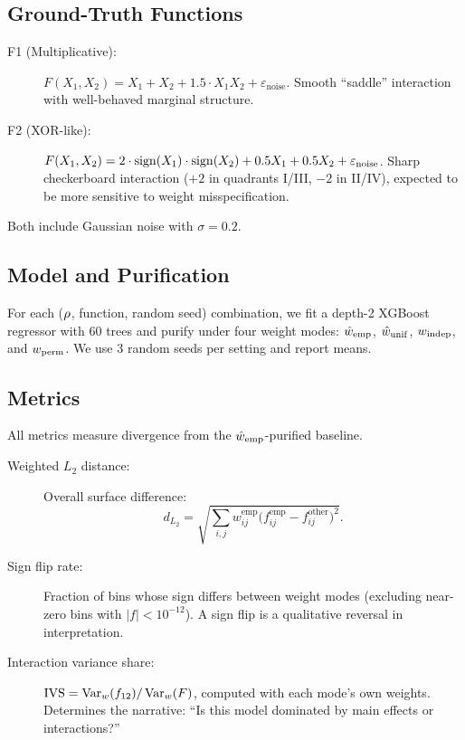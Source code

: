 \subsection{Ground-Truth Functions}

\begin{description}
    \item[F1 (Multiplicative):] $F(X_1, X_2) = X_1 + X_2 + 1.5 \cdot X_1 X_2 + \varepsilon_{\text{noise}}$.
    Smooth ``saddle'' interaction with well-behaved marginal structure.

    \item[F2 (XOR-like):] $F(X_1, X_2) = 2 \cdot \operatorname{sign}(X_1) \cdot \operatorname{sign}(X_2) + 0.5 X_1 + 0.5 X_2 + \varepsilon_{\text{noise}}$.
    Sharp checkerboard interaction ($+2$ in quadrants I/III, $-2$ in II/IV), expected to be more sensitive to weight misspecification.
\end{description}
Both include Gaussian noise with $\sigma = 0.2$.

\subsection{Model and Purification}

For each ($\rho$, function, random seed) combination, we fit a depth-2 XGBoost regressor with 60 trees and purify under four weight modes: $\hat{w}_{\mathrm{emp}}$, $\hat{w}_{\mathrm{unif}}$, $w_{\mathrm{indep}}$, and $w_{\mathrm{perm}}$.
We use 3 random seeds per setting and report means.

\subsection{Metrics}\label{sec:metrics}

All metrics measure divergence from the $\hat{w}_{\mathrm{emp}}$-purified baseline.

\begin{description}
    \item[Weighted $L_2$ distance:] Overall surface difference:
    \[
        d_{L_2} = \sqrt{\sum_{i,j} w^{\text{emp}}_{ij} \bigl(f^{\text{emp}}_{ij} - f^{\text{other}}_{ij}\bigr)^2}.
    \]

    \item[Sign flip rate:] Fraction of bins whose sign differs between weight modes (excluding near-zero bins with $|f| < 10^{-12}$).
    A sign flip is a qualitative reversal in interpretation.

    \item[Interaction variance share:] $\text{IVS} = \operatorname{Var}_{w}(f_{12}) / \operatorname{Var}_{w}(F)$, computed with each mode's own weights.
    Determines the narrative: ``Is this model dominated by main effects or interactions?''
\end{description}
